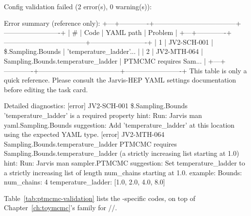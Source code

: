 \begin{terminal}
\begin{jout}
Config validation failed (2 error(s), 0 warning(s)):

Error summary (reference only):
+---+-------------+------------------------------------+-------------------------+
| # | Code        | YAML path                          | Problem                 |
+---+-------------+------------------------------------+-------------------------+
| 1 | JV2-SCH-001 | \$.Sampling.Bounds                  | 'temperature_ladder'... |
| 2 | JV2-MTH-064 | Sampling.Bounds.temperature_ladder | PTMCMC requires Sam...  |
+---+-------------+------------------------------------+-------------------------+
This table is only a quick reference. Please consult the Jarvis-HEP YAML settings
documentation before editing the task card.

Detailed diagnostics:
  [error] JV2-SCH-001  \$.Sampling.Bounds
          'temperature_ladder' is a required property
          hint: Run: Jarvis man yaml.Sampling.Bounds
          suggestion: Add 'temperature_ladder' at this location using the
          expected YAML type.
  [error] JV2-MTH-064  Sampling.Bounds.temperature_ladder
          PTMCMC requires Sampling.Bounds.temperature_ladder (a strictly
          increasing list starting at 1.0)
          hint: Run: Jarvis man sampler.PTMCMC
          suggestion: Set temperature_ladder to a strictly increasing list of
          length num_chains starting at 1.0.
          example:
            Bounds:
              num_chains: 4
              temperature_ladder: [1.0, 2.0, 4.0, 8.0]
\end{jout}
\end{terminal}

Table~\ref{tab:ptmcmc-validation} lists the -specific codes, on top of
Chapter~\ref{ch:toymcmc}'s  family for
//.


